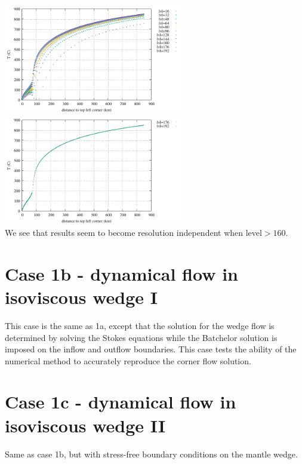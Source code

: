 \begin{center}
\includegraphics[width=8cm]{python_codes/fieldstone_149/results/case1a/diagT.pdf}
\includegraphics[width=8cm]{python_codes/fieldstone_149/results/case1a/diagT2.pdf}\\
{\captionfont We see that results seem to become resolution independent
when level$>160$.} 
\end{center}

\newpage
\section*{Case 1b - dynamical flow in isoviscous wedge I}

This case is the same as 1a, except that the solution
for the wedge flow is determined by solving the Stokes equations while the Batchelor solution is
imposed on the inflow and outflow boundaries. This case tests the ability of the numerical method
to accurately reproduce the corner flow solution.

\newpage
\section*{Case 1c - dynamical flow in isoviscous wedge II} 

Same as case 1b, but with stress-free boundary conditions on the mantle wedge.


